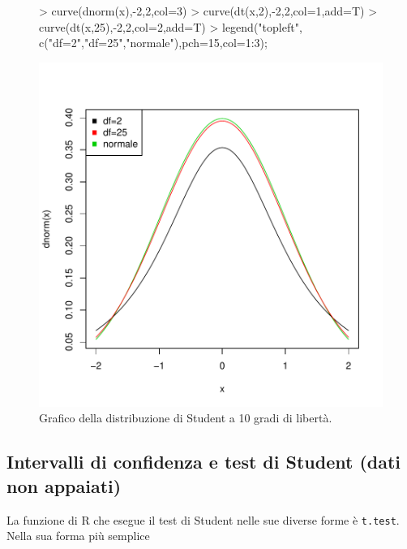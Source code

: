 \documentclass[onecolumn,12pt]{book}
\begin{document}
\begin{figure}[H]
\begin{center}
\begin{Schunk}
\begin{Sinput}
> curve(dnorm(x),-2,2,col=3)
> curve(dt(x,2),-2,2,col=1,add=T)
> curve(dt(x,25),-2,2,col=2,add=T)
> legend("topleft", c("df=2","df=25","normale"),pch=15,col=1:3);
\end{Sinput}
\end{Schunk}
\includegraphics{RbookParte2-080}
\caption{Grafico della distribuzione di Student a 10 gradi di libert\`a. }
\label{fig:graficostudent}
\end{center}
\end{figure}
 \subsection
{Intervalli di confidenza e test di Student (dati non appaiati)}
La funzione di
\textsf{R} che esegue il test di Student nelle sue diverse forme \`e  \texttt{t.test}.   Nella sua forma pi\`u semplice
\end{document}
